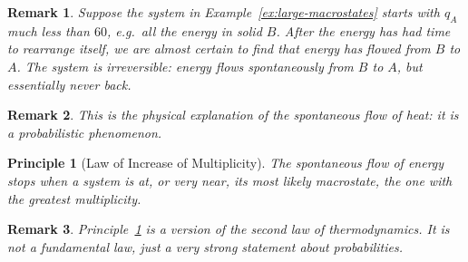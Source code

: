\documentclass{article}
\newtheorem{principle}{Principle}
\newtheorem{remark}{Remark}
\begin{document}
\begin{remark}
    Suppose the system in Example~\ref{ex:large-macrostates} starts with $q_A$ much less than $60$, e.g.\ all the energy in solid $B$. After the energy has had time to rearrange itself, we are almost certain to find that energy has flowed from $B$ to $A$. The system is irreversible: energy flows spontaneously from $B$ to $A$, but essentially never back.
\end{remark}
\begin{remark}
    This is the physical explanation of the spontaneous flow of heat: it is a probabilistic phenomenon.
\end{remark}
\begin{principle}[Law of Increase of Multiplicity]
    \label{law:increase-multiplicity}
    The spontaneous flow of energy stops when a system is at, or very near, its most likely macrostate, the one with the greatest multiplicity.
\end{principle}
\begin{remark}
    Principle~\ref{law:increase-multiplicity} is a version of the second law of thermodynamics. It is not a fundamental law, just a very strong statement about probabilities.
\end{remark}
\end{document}
